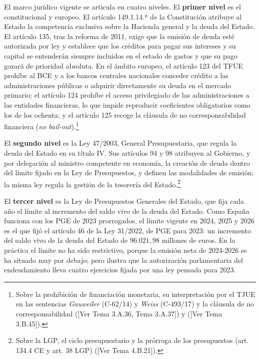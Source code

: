 \documentclass[10pt,a4paper]{article}
\newcommand{\authorfont}[1]{{\fontfamily{EBGaramond-TLF}\selectfont #1}}
\begin{document}
El marco jurídico vigente se articula en cuatro niveles. El \textbf{primer nivel} es el constitucional y europeo. El artículo 149.1.14.ª de la Constitución atribuye al Estado la competencia exclusiva sobre la Hacienda general y la deuda del Estado. El artículo 135, tras la reforma de 2011, exige que la emisión de deuda esté autorizada por ley y establece que los créditos para pagar sus intereses y su capital se entenderán siempre incluidos en el estado de gastos y que su pago gozará de prioridad absoluta. En el ámbito europeo, el artículo 123 del TFUE prohíbe al BCE y a los bancos centrales nacionales conceder crédito a las administraciones públicas o adquirir directamente su deuda en el mercado primario; el artículo 124 prohíbe el acceso privilegiado de las administraciones a las entidades financieras, lo que impide reproducir coeficientes obligatorios como los de los ochenta; y el artículo 125 recoge la cláusula de no corresponsabilidad financiera (\textit{no bail-out}).\footnote{Sobre la prohibición de financiación monetaria, su interpretación por el TJUE en las sentencias \textit{Gauweiler} (C-62/14) y \textit{Weiss} (C-493/17) y la cláusula de no corresponsabilidad ([\authorfont{Ver Tema 3.A.36, Tema 3.A.37}]) y ([\authorfont{Ver Tema 3.B.45}]).
}

El \textbf{segundo nivel} es la Ley 47/2003, General Presupuestaria, que regula la deuda del Estado en su título IV. Sus artículos 94 y 98 atribuyen al Gobierno, y por delegación al ministro competente en economía, la creación de deuda dentro del límite fijado en la Ley de Presupuestos, y definen las modalidades de emisión; la misma ley regula la gestión de la tesorería del Estado.\footnote{Sobre la LGP, el ciclo presupuestario y la prórroga de los presupuestos (art. 134.4 CE y art. 38 LGP) ([\authorfont{Ver Tema 4.B.21}]).
}

El \textbf{tercer nivel} es la Ley de Presupuestos Generales del Estado, que fija cada año el límite al incremento del saldo vivo de la deuda del Estado. Como España funciona con los PGE de 2023 prorrogados, el límite vigente en 2024, 2025 y 2026 es el que fijó el artículo 46 de la Ley 31/2022, de PGE para 2023: un incremento del saldo vivo de la deuda del Estado de $96.021,98$ millones de euros. En la práctica el límite no ha sido restrictivo, porque la emisión neta de 2024-2026 se ha situado muy por debajo; pero ilustra que la autorización parlamentaria del endeudamiento lleva cuatro ejercicios fijada por una ley pensada para 2023.
\end{document}
